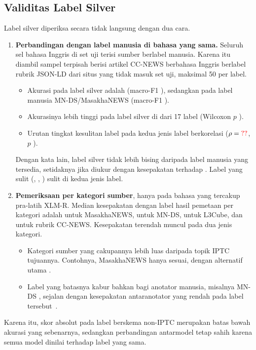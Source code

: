 \subsection{Validitas Label Silver}
\label{sec:res-validity}
Label silver diperiksa secara tidak langsung dengan dua cara.
\begin{enumerate}
  \item \textbf{Perbandingan dengan label manusia di bahasa yang sama.} Seluruh sel bahasa Inggris di set uji terisi sumber berlabel manusia. Karena itu diambil sampel terpisah berisi  artikel CC-NEWS berbahasa Inggris berlabel rubrik JSON-LD dari  situs yang tidak masuk set uji, maksimal 50 per label.
  \begin{itemize}
    \item Akurasi  pada label silver adalah  (macro-F1 ), sedangkan pada label manusia MN-DS/MasakhaNEWS  (macro-F1 ).
    \item Akurasinya lebih tinggi pada label silver di  dari 17 label (Wilcoxon $p$ ).
    \item Urutan tingkat kesulitan label pada kedua jenis label berkorelasi ($\rho=\val{valid.en.label_rho}$, $p$ ).
  \end{itemize}
  Dengan kata lain, label silver tidak lebih bising daripada label manusia yang tersedia, setidaknya jika diukur dengan kesepakatan terhadap . Label yang sulit (, , ) sulit di kedua jenis label.
  \item \textbf{Pemeriksaan per kategori sumber}, hanya pada bahasa yang tercakup pra-latih XLM-R. Median kesepakatan  dengan label hasil pemetaan per kategori adalah  untuk MasakhaNEWS,  untuk MN-DS,  untuk L3Cube, dan  untuk rubrik CC-NEWS. Kesepakatan terendah muncul pada dua jenis kategori.
  \begin{itemize}
    \item Kategori sumber yang cakupannya lebih luas daripada topik IPTC tujuannya. Contohnya, MasakhaNEWS  hanya  sesuai, dengan alternatif utama .
    \item Label yang batasnya kabur bahkan bagi anotator manusia, misalnya MN-DS , sejalan dengan kesepakatan antaranotator yang rendah pada label tersebut~\cite{kuzman2025llm}.
  \end{itemize}
\end{enumerate}
Karena itu, skor absolut pada label berskema non-IPTC merupakan batas bawah akurasi yang sebenarnya, sedangkan perbandingan antarmodel tetap sahih karena semua model dinilai terhadap label yang sama.

